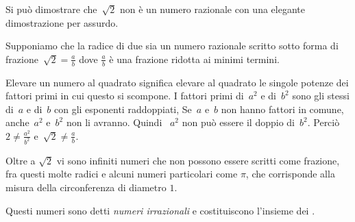Si può dimostrare che~\(\sqrt{2}\) non è un numero razionale con una 
elegante dimostrazione per assurdo. 

Supponiamo che la radice di due sia un numero razionale scritto sotto forma 
di frazione~\(\sqrt{2}= \frac{a}{b}\) dove \(\frac{a}{b}\) è una frazione 
ridotta ai minimi termini.


Elevare un numero al quadrato significa elevare al quadrato le
singole potenze dei fattori primi in cui questo si scompone. I fattori
primi di~\(a^{2}\) e di~\(b^{2}\) sono gli stessi di~\(a\) e di~\(b\) con
gli esponenti raddoppiati, Se~\(a\) e~\(b\) non hanno fattori in comune, 
anche~\(a^{2}\) e~\(b^{2}\) non li avranno. Quindi ~\(a^{2}\) non può essere 
il doppio di~\(b^{2}\).
Perciò~\(2\ne\frac{a^{2}}{b^{2}}\) e~\(\sqrt{2}\ne\frac{a}{b}\).

Oltre a \(\sqrt{2}\) vi sono infiniti numeri che non possono essere 
scritti come frazione, fra questi molte radici e alcuni numeri particolari 
come \(\pi\), che corrisponde alla misura della circonferenza di diametro 
\(1\).

Questi numeri sono detti \emph{numeri irrazionali} e costituiscono l'insieme 
\indt{\(\J\)} dei .


